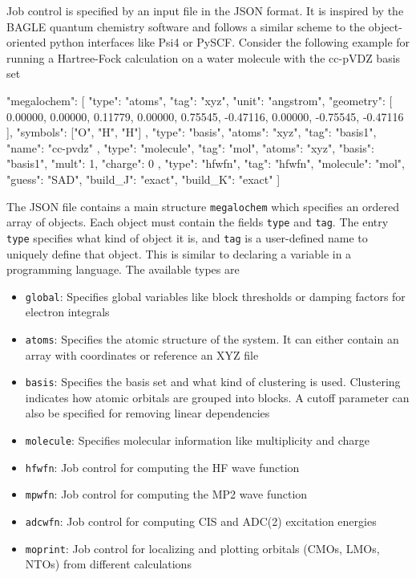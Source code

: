 Job control is specified by an input file in the JSON format. It is inspired by the BAGLE quantum chemistry software \cite{Shi2017} and follows a similar scheme to the object-oriented python interfaces like Psi4 or PySCF. Consider the following example for running a Hartree-Fock calculation on a water molecule with the cc-pVDZ basis set
\begin{code}
{
  "megalochem": [
  {
    "type": "atoms",
    "tag": "xyz",
    "unit": "angstrom",
    "geometry": [
      0.00000,        0.00000,        0.11779,
      0.00000,        0.75545,       -0.47116,
      0.00000,       -0.75545,       -0.47116
    ],
    "symbols": ["O", "H", "H"]
  },
  {
    "type": "basis",
    "atoms": "xyz",
    "tag": "basis1",
    "name": "cc-pvdz"
  },
  {
    "type": "molecule",
    "tag": "mol",
    "atoms": "xyz",
    "basis": "basis1",
    "mult": 1,
    "charge": 0
  },
  {
    "type": "hfwfn",
    "tag": "hfwfn",
    "molecule": "mol",
    "guess": "SAD",
    "build_J": "exact",
    "build_K": "exact"
   }]
}
\end{code}  
\noindent The JSON file contains a main structure \texttt{megalochem} which specifies an ordered array of objects. Each object must contain the fields \texttt{type} and  \texttt{tag}. The entry \texttt{type} specifies what kind of object it is, and \texttt{tag} is a user-defined name to uniquely define that object. This is similar to declaring a variable in a programming language. The available types are
\begin{itemize}
\item \texttt{global}: Specifies global variables like block thresholds or damping factors for electron integrals

\item \texttt{atoms}: Specifies the atomic structure of the system. It can either contain an array with coordinates or reference an XYZ file

\item \texttt{basis}: Specifies the basis set and what kind of clustering is used. Clustering indicates how atomic orbitals are grouped into blocks. A cutoff parameter can also be specified for removing linear dependencies

\item \texttt{molecule}: Specifies molecular information like multiplicity and charge

\item \texttt{hfwfn}: Job control for computing the HF wave function

\item \texttt{mpwfn}: Job control for computing the MP2 wave function

\item \texttt{adcwfn}: Job control for computing CIS and ADC(2) excitation energies

\item \texttt{moprint}: Job control for localizing and plotting orbitals (CMOs, LMOs, NTOs) from different calculations

\end{itemize} 

